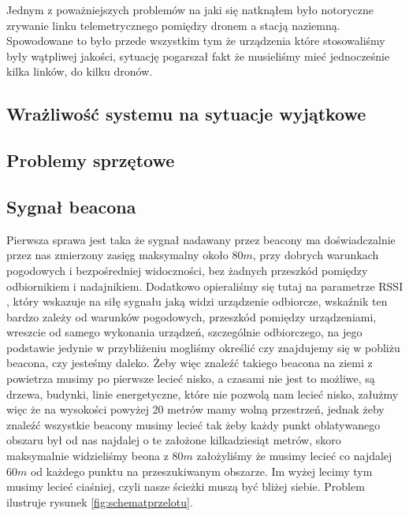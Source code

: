 Jednym z poważniejszych problemów na jaki się natknąłem było notoryczne zrywanie linku telemetrycznego pomiędzy dronem a stacją naziemną. Spowodowane to było przede wszystkim tym że urządzenia które stosowaliśmy były wątpliwej jakości, sytuację pogarszał fakt że musieliśmy mieć jednocześnie kilka linków, do kilku dronów. 

\subsection{Wrażliwość systemu na sytuacje wyjątkowe}

\subsection{Problemy sprzętowe}
\subsection{Sygnał beacona}

Pierwsza sprawa jest taka że sygnał nadawany przez beacony ma doświadczalnie przez nas zmierzony zasięg maksymalny około $80 m$, przy dobrych warunkach pogodowych i bezpośredniej widoczności, bez żadnych przeszkód pomiędzy odbiornikiem i nadajnikiem. Dodatkowo opieraliśmy się tutaj na parametrze RSSI \cite{rssi}, który wskazuje na siłę sygnału jaką widzi urządzenie odbiorcze, wskaźnik ten bardzo zależy od warunków pogodowych, przeszkód pomiędzy urządzeniami, wreszcie od samego wykonania urządzeń, szczególnie odbiorczego, na jego podstawie jedynie w przybliżeniu mogliśmy określić czy znajdujemy się w pobliżu beacona, czy jesteśmy daleko. Żeby więc znaleźć takiego beacona na ziemi z powietrza musimy po pierwsze lecieć nisko, a czasami nie jest to możliwe, są drzewa, budynki, linie energetyczne, które nie pozwolą nam lecieć nisko, załużmy więc że na wysokości powyżej 20 metrów mamy wolną przestrzeń, jednak żeby znaleźć wszystkie beacony musimy lecieć tak żeby każdy punkt oblatywanego obszaru był od nas najdalej o te założone kilkadziesiąt metrów, skoro maksymalnie widzieliśmy beona z $80 m$ założyliśmy że musimy lecieć co najdalej $60 m$ od każdego punktu na przeszukiwanym obszarze. Im wyżej lecimy tym musimy lecieć ciaśniej, czyli nasze ścieżki muszą być bliżej siebie. Problem ilustruje rysunek \ref{fig:schematprzelotu}.

